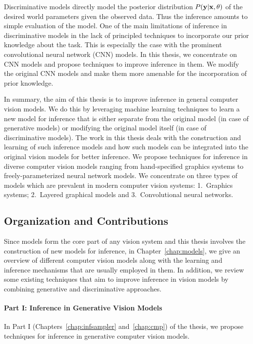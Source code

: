 Discriminative models directly model the posterior distribution $P(\mathbf{y}|\mathbf{x},\mathbf{\theta})$
of the desired world parameters given the observed data. Thus the inference amounts
to simple evaluation of the model. One of the main limitations of inference
in discriminative models in the lack of principled techniques to incorporate
our prior knowledge about the task. This is especially the case with the prominent
convolutional neural network (CNN) models. In this thesis, we concentrate on CNN
models and propose techniques to improve inference in them. We modify the original
CNN models and make them more amenable for the incorporation of prior knowledge.

In summary, the aim of this thesis is to improve inference in general computer
vision models. We do this by leveraging machine learning techniques to learn
a new model for inference that is either separate from the original model (in case
of generative models) or modifying the original model itself (in case of
discriminative models). The work in this thesis deals
with the construction and learning of such inference models and how such models
can be integrated into the original vision models for better inference. We propose
techniques for inference in diverse computer vision models ranging from hand-specified
graphics systems to freely-parameterized neural network models. We concentrate on three
types of models which are prevalent in modern computer vision systems:
1.~Graphics systems; 2.~Layered graphical models and 3.~Convolutional neural networks.


\subsection{Organization and Contributions}

Since models form the core part of any vision system and this thesis involves the construction of
new models for inference, in Chapter~\ref{chap:models}, we give an overview of different
computer vision models along with the learning and inference mechanisms that are
usually employed in them. In addition, we review some existing techniques that aim to
improve inference in vision models by combining generative and discriminative approaches.

\vspace{-0.3cm}
\paragraph{Part I: Inference in Generative Vision Models} In Part I
(Chapters~\ref{chap:infsampler} and~\ref{chap:cmp})
of the thesis, we propose techniques for inference in generative computer vision models.


